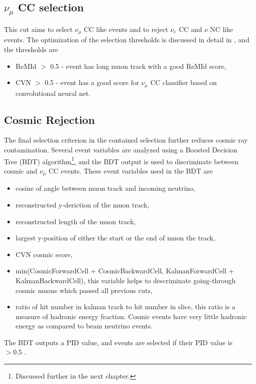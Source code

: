 \subsection{$\nu_\mu$ CC selection} \label{CCSel}
This cut aims to select $\nu_\mu$ CC like events and to reject $\nu_e$ CC and $\nu$ NC like events.
The optimization of the selection thresholds is discussed in detail in \cite{numupid_technote}, 
and the thresholds are
\begin{itemize}
\item ReMId $>$ 0.5 - event has long muon track with a good ReMId score,
\item CVN $>$ 0.5 - event has a good score for $\nu_\mu$ CC classifier based on convolutional neural net.
\end{itemize}

\subsection{Cosmic Rejection}
The final selection criterion in the contained selection further reduces cosmic ray contamination.
Several event variables are analyzed using a Boosted Decision Tree (BDT) algorithm\footnote{Discussed 
further in the next chapter.}\cite{cosrej_technote}, and the BDT output is used to discriminate between 
cosmic and $\nu_\mu$ CC events. These event variables used in the BDT are
\begin{itemize}
\item cosine of angle between muon track and incoming neutrino,
\item reconstructed y-deriction of the muon track,
\item reconstructed length of the muon track,
\item largest y-position of either the start or the end of muon the track,
\item CVN cosmic score,
\item min(CosmicForwardCell + CosmicBackwardCell, KalmanForwardCell + KalmanBackwardCell), this 
variable helps to descriminate going-through cosmic muons which passed all previous cuts,
\item ratio of hit number in kalman track to hit number in slice, this ratio is a measure of hadronic
energy fraction. Cosmic events have very little hadronic energy as compared to beam neutrino events. 
\end{itemize}
The BDT outputs a PID value, and events are selected if their PID value is $> 0.5$ \cite{numupid_technote}.

